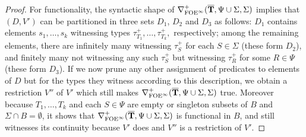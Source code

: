 \begin{proof}
For functionality, the syntactic shape of $\mondbnfofoei{\vlist{T}}{\Psi \cup \Sigma}{ \Sigma}{+}$ implies that $(D,V')$ can be partitioned in three sets $D_1$, $D_2$ and $D_3$ as follows: $D_1$ contains elements $s_1, \dots, s_k$ witnessing types $\tau^+_{T_1},\dots, \tau^+_{T_k},$ respectively; among the remaining elements, there are infinitely many witnessing $\tau^+_S$ for each $S\in \Sigma$ (these form $D_2$), and finitely many not witnessing any such $\tau^+_S$ but witnessing $\tau^+_R$ for some $R \in \Psi$ (these form $D_3$). If we now prune any other assignment of predicates to elements of $D$ but for the types they witness according to this description, we obtain a restriction $V''$ of $V'$ which still makes $\mondbnfofoei{\vlist{T}}{\Psi \cup \Sigma}{ \Sigma}{+}$ true. Moreover because $T_1,\dots,T_k$ and each $S \in \Psi$ are empty or singleton subsets of $B$ and $\Sigma \cap B = \emptyset$, it shows that $\mondbnfofoei{\vlist{T}}{\Psi \cup \Sigma}{ \Sigma}{+}$ is functional in $B$, and still witnesses its continuity because $V'$ does and $V''$ is a restriction of $V'$.  %
\end{proof}

